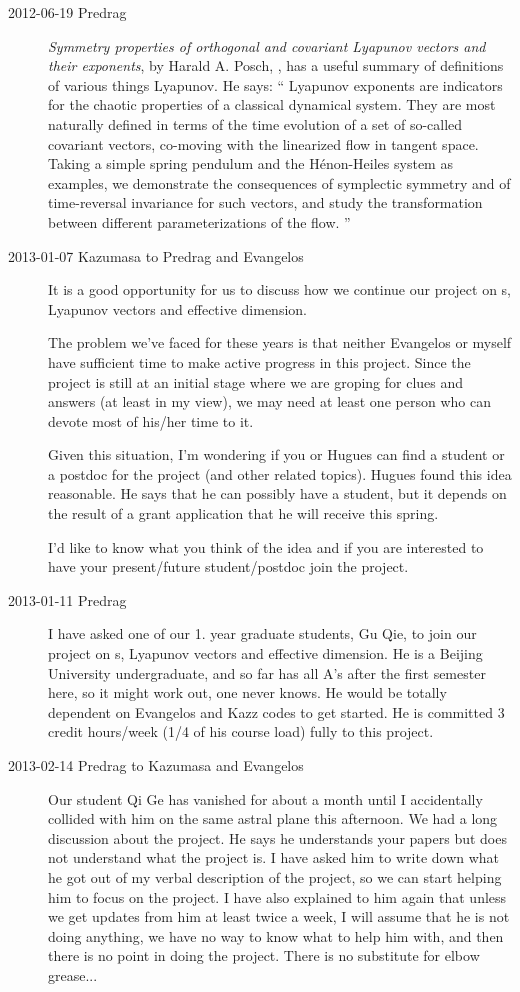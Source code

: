 \begin{description}
\item[2012-06-19 Predrag]                               \toCB
{\em Symmetry properties of orthogonal and covariant {Lyapunov} vectors
and their exponents}, by Harald A. Posch, , has a useful
summary of definitions of various things Lyapunov.
He says: ``
Lyapunov exponents are indicators for the chaotic properties of a
classical dynamical system. They are most naturally defined in terms of
the time evolution of a set of so-called covariant vectors, co-moving
with the linearized flow in tangent space. Taking a simple spring
pendulum and the H\'enon-Heiles system as examples, we demonstrate the
consequences of symplectic symmetry and of time-reversal invariance for
such vectors, and study the transformation between different
parameterizations of the flow.
''

\item[2013-01-07 Kazumasa to Predrag and Evangelos]
It is a good opportunity for us to discuss how we continue our
project on \po s, Lyapunov vectors and effective dimension.

The problem we've faced for these years is that neither Evangelos or
myself have sufficient time to make active progress in this project.
Since the project is still at an initial stage where we are groping
for clues and answers (at least in my view), we may need at least one
person who can devote most of his/her time to it.

Given this situation, I'm wondering if you or Hugues can find a
student or a postdoc for the project (and other related topics).
Hugues found this idea reasonable. He says that he can possibly have
a student, but it depends on the result of a grant application that
he will receive this spring.

I'd like to know what you think of the idea and if you are interested
to have your present/future student/postdoc join the project.

\item[2013-01-11 Predrag]
I have asked one of our 1. year graduate students, Gu Qie, to join
our project on \po s, Lyapunov vectors and effective dimension. He is
a Beijing University undergraduate, and so far has all A's after the
first semester here, so it might work out, one never knows. He would
be totally dependent on Evangelos and Kazz codes to get started. He
is committed 3 credit hours/week (1/4 of his course load) fully to
this project.

\item[2013-02-14 Predrag to Kazumasa and Evangelos] Our student Qi Ge
has vanished for about a month until I accidentally collided with him
on the same astral plane this afternoon. We had a long discussion
about the project. He says he understands your papers but does not
understand what the project is. I have asked him to write down what
he got out of my verbal description of the project, so we can start
helping him to focus on the project. I have also explained to him
again that unless we get updates from him at least twice a week, I
will assume that he is not doing anything, we have no way to know
what to help him with, and then there is no point in doing the
project. There is no substitute for elbow grease...


\end{description}
